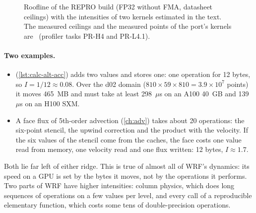 \begin{figure}[ht]
\centering
{}
\caption{Roofline of the REPRO build (FP32 without FMA, datasheet ceilings) with the intensities of two kernels
estimated in the text. The measured ceilings and the measured points of the port's kernels are \tbr\ (profiler tasks
PR-H4 and PR-L4.1).}
\label{fig:roofline}
\end{figure}

\paragraph{Two examples.}
\begin{itemize}
  \item {} (\cref{lst:calc-alt-acc}) adds two values and stores one: one operation for 12 bytes, so
    $I = 1/12 \approx 0.08$. Over the d02 domain ($810 \times 59 \times 810 = 3.9 \times 10^7$ points) it moves
    465~MB and must take at least 298~$\mu$s on an A100 40~GB and 139~$\mu$s on an H100 SXM.
  \item A face flux of 5th-order advection (\cref{ch:adv}) takes about 20 operations: the six-point stencil, the
    upwind correction and the product with the velocity. If the six values of the stencil come from the caches, the
    face costs one value read from memory, one velocity read and one flux written: 12 bytes, $I \approx 1.7$.
\end{itemize}
Both lie far left of either ridge. This is true of almost all of WRF's dynamics: its speed on a GPU is set by the
bytes it moves, not by the operations it performs. Two parts of WRF have higher intensities: column physics, which
does long sequences of operations on a few values per level, and every call of a reproducible elementary function,
which costs some tens of double-precision operations.


